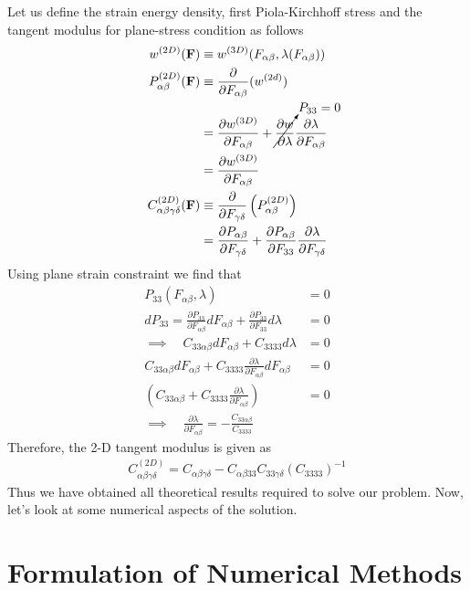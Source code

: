\documentclass[../main.tex]{subfiles}
\begin{document}
Let us define the strain energy density, first Piola-Kirchhoff stress
and the tangent modulus for plane-stress condition as follows
\begin{align*}
  w^{(2D)}(\mathbf{F}) &\equiv w^{(3D)}(F_{\alpha\beta},\lambda(F_{\alpha\beta}))\\
  P^{(2D)}_{\alpha\beta}(\mathbf{F})&\equiv \frac{\partial}{\partial F_{\alpha\beta}}(w^{(2d)})\\
                       &= \frac{\partial w^{(3D)}}{\partial F_{\alpha\beta}} +\cancelto{P_{33}=0}{\frac{\partial w}{\partial \lambda}}\frac{\partial \lambda}{\partial F_{\alpha\beta}}\\
                       &= \frac{\partial w^{(3D)}}{\partial F_{\alpha\beta}}\\
  C^{(2D)}_{\alpha\beta\gamma\delta}(\mathbf{F})&\equiv \frac{\partial}{\partial F_{\gamma\delta}}\left(P^{(2D)}_{\alpha\beta}\right)\\
                       &=\frac{\partial P_{\alpha\beta}}{\partial F_{\gamma\delta}} + \frac{\partial P_{\alpha\beta}}{\partial F_{33}}\frac{\partial\lambda}{\partial F_{\gamma\delta}}
\end{align*}
Using plane strain constraint we find that
\begin{align*}
  P_{33}(F_{\alpha\beta},\lambda)&=0\\
  dP_{33} = \frac{\partial P_{33}}{\partial F_{\alpha\beta}}dF_{\alpha\beta} + \frac{\partial P_{33}}{\partial F_{33}}d\lambda &= 0\\
  \implies \quad C_{33\alpha\beta}dF_{\alpha\beta}+C_{3333}d\lambda &=0\\
  C_{33\alpha\beta}dF_{\alpha\beta}+C_{3333}\frac{\partial\lambda}{\partial F_{\alpha\beta}}dF_{\alpha\beta} &=0\\
  \left(C_{33\alpha\beta}+C_{3333}\frac{\partial\lambda}{\partial F_{\alpha\beta}}\right) &=0\\
  \implies\quad\boxed{\frac{\partial\lambda}{\partial F_{\alpha\beta}} = -\frac{C_{33\alpha\beta}}{C_{3333}}}
\end{align*}
Therefore, the 2-D tangent modulus is given as
\begin{align*}
  \boxed{C^{(2D)}_{\alpha\beta\gamma\delta} = C_{\alpha\beta\gamma\delta} - C_{\alpha\beta33}C_{33\gamma\delta}\left(C_{3333}\right)^{-1}}
\end{align*}
Thus we have obtained all theoretical results required to solve our
problem. Now, let's look at some numerical aspects of the solution.
\section{Formulation of Numerical Methods}
\end{document}
